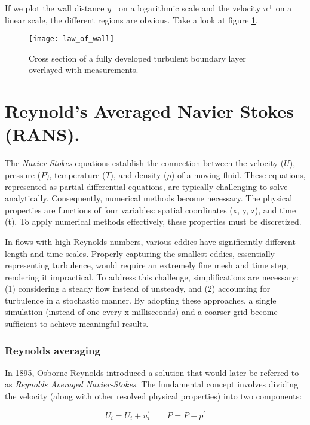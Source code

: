 If we plot the wall distance $y^{+}$ on a logarithmic scale and the velocity
$u^{+}$ on a linear scale, the different regions are obvious. Take a look at
figure \ref{fig:law_of_wall}.

\begin{figure}[H] \centering
\texttt{[image: law\_of\_wall]}
    \caption{Cross section of a fully developed turbulent boundary layer
             overlayed with measurements\cite{Schlichting2018}.}
    \label{fig:law_of_wall}
\end{figure}




\section{Reynold's Averaged Navier Stokes (RANS).}
The \textit{Navier-Stokes} equations establish the connection between the
velocity ($U$), pressure ($P$), temperature ($T$), and density ($\rho$) of a
moving fluid. These equations, represented as partial differential equations,
are typically challenging to solve analytically. Consequently, numerical
methods become necessary. The physical properties are functions of four
variables: spatial coordinates (x, y, z), and time (t). To apply numerical
methods effectively, these properties must be discretized. \cite{nasaNS}

In flows with high Reynolds numbers, various eddies have significantly
different length and time scales. Properly capturing the smallest eddies,
essentially representing turbulence, would require an extremely fine mesh and
time step, rendering it impractical. To address this challenge, simplifications
are necessary: (1) considering a steady flow instead of unsteady, and (2)
accounting for turbulence in a stochastic manner. By adopting these approaches,
a single simulation (instead of one every x milliseconds) and a coarser grid
become sufficient to achieve meaningful results.


\subsubsection{Reynolds averaging}
In 1895, Osborne Reynolds introduced a solution that would later be referred to
as \textit{Reynolds Averaged Navier-Stokes}. The fundamental concept involves
dividing the velocity (along with other resolved physical properties) into two
components: \cite{leschziner2015statistical}

\begin{equation}
    U_{i} = \bar U_{i} + u_{i}^{\prime} \qquad
    P = \bar P + p^{\prime}
\end{equation}

